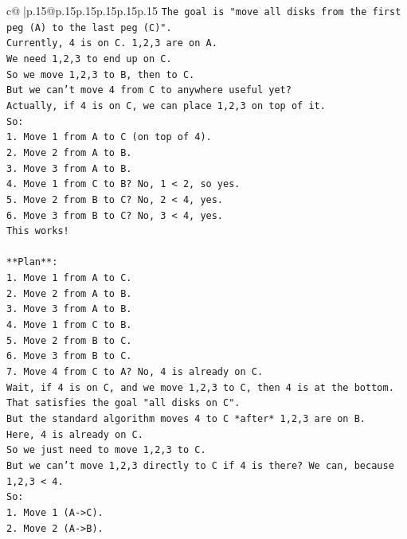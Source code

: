 \documentclass{article}
\begin{document}
{\begin{supertabular}{c@{$\;$}|p{.15\linewidth}@{}p{.15\linewidth}p{.15\linewidth}p{.15\linewidth}p{.15\linewidth}p{.15\linewidth}}
{{{\texttt{The goal is "move all disks from the first peg (A) to the last peg (C)".} \\
\texttt{Currently, 4 is on C. 1,2,3 are on A.} \\
\texttt{We need 1,2,3 to end up on C.} \\
\texttt{So we move 1,2,3 to B, then to C.} \\
\texttt{But we can't move 4 from C to anywhere useful yet?} \\
\texttt{Actually, if 4 is on C, we can place 1,2,3 on top of it.} \\
\texttt{So:} \\
\texttt{1. Move 1 from A to C (on top of 4).} \\
\texttt{2. Move 2 from A to B.} \\
\texttt{3. Move 3 from A to B.} \\
\texttt{4. Move 1 from C to B? No, 1 < 2, so yes.} \\
\texttt{5. Move 2 from B to C? No, 2 < 4, yes.} \\
\texttt{6. Move 3 from B to C? No, 3 < 4, yes.} \\
\texttt{This works!} \\
\\ 
\texttt{**Plan**:} \\
\texttt{1. Move 1 from A to C.} \\
\texttt{2. Move 2 from A to B.} \\
\texttt{3. Move 3 from A to B.} \\
\texttt{4. Move 1 from C to B.} \\
\texttt{5. Move 2 from B to C.} \\
\texttt{6. Move 3 from B to C.} \\
\texttt{7. Move 4 from C to A? No, 4 is already on C.} \\
\texttt{Wait, if 4 is on C, and we move 1,2,3 to C, then 4 is at the bottom. That satisfies the goal "all disks on C".} \\
\texttt{But the standard algorithm moves 4 to C *after* 1,2,3 are on B.} \\
\texttt{Here, 4 is already on C.} \\
\texttt{So we just need to move 1,2,3 to C.} \\
\texttt{But we can't move 1,2,3 directly to C if 4 is there? We can, because 1,2,3 < 4.} \\
\texttt{So:} \\
\texttt{1. Move 1 (A{-}>C).} \\
\texttt{2. Move 2 (A{-}>B).} \\
}}}
\end{supertabular}}
\end{document}
